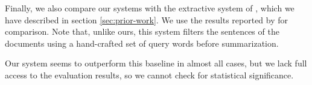 \documentclass[a4paper,BCOR=10mm]{report}
\numberwithin{lemma}{chapter}
\numberwithin{definition}{chapter}
\begin{document}
Finally, we also compare our systems with the extractive system of \citet{chieu}, which we have described in section \ref{sec:prior-work}.
We use the results reported by \citet{markert} for comparison. Note that, unlike ours, this system filters the sentences of the documents using a hand-crafted set of query words before summarization.

Our system seems to outperform this baseline in almost all cases, but we lack full access to the evaluation results, so we cannot check for statistical significance.

%
%
%
%
\end{document}
